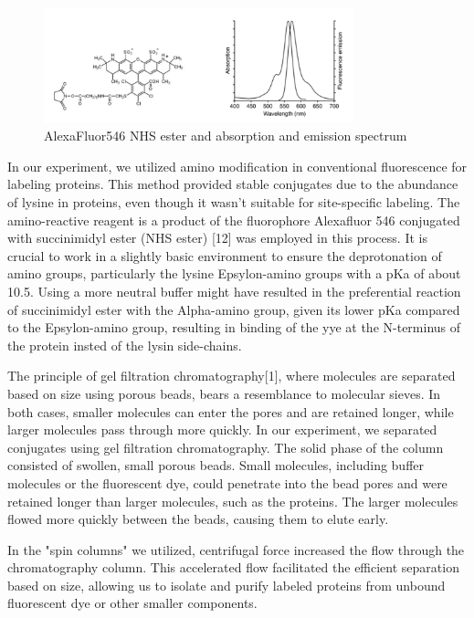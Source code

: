 \documentclass[a4paper,english,12pt,bibliography=totoc]{scrreprt}
\begin{document}
\begin{figure}[H]
    \centering
    \includegraphics[width=0.8\textwidth]{alexafluor546.png}
    \caption{AlexaFluor546 NHS ester and absorption and emission spectrum}
    \label{fig:ViolinPlot}
\end{figure}


In our experiment, we utilized amino modification in conventional fluorescence for labeling proteins. This method provided stable conjugates due to the abundance of lysine in proteins, even though it wasn't suitable for site-specific labeling. The amino-reactive reagent is a product of the fluorophore Alexafluor 546  conjugated with succinimidyl ester (NHS ester) [12] was employed in this process. It is crucial to work in a slightly basic environment to ensure the deprotonation of amino groups, particularly the lysine Epsylon-amino groups with a pKa of about 10.5. Using a more neutral buffer might have resulted in the preferential reaction of succinimidyl ester with the Alpha-amino group, given its lower pKa compared to the Epsylon-amino group, resulting in binding of the yye at the N-terminus of the protein insted of the lysin side-chains.
\newline

The principle of gel filtration chromatography[1], where molecules are separated based on size using porous beads, bears a resemblance to molecular sieves. In both cases, smaller molecules can enter the pores and are retained longer, while larger molecules pass through more quickly.
In our experiment, we separated conjugates using gel filtration chromatography. The solid phase of the column consisted of swollen, small porous beads. Small molecules, including buffer molecules or the fluorescent dye, could penetrate into the bead pores and were retained longer than larger molecules, such as the proteins. The larger molecules flowed more quickly between the beads, causing them to elute early.

In the "spin columns" we utilized, centrifugal force increased the flow through the chromatography column. This accelerated flow facilitated the efficient separation based on size, allowing us to isolate and purify labeled proteins from unbound fluorescent dye or other smaller components.
\end{document}
